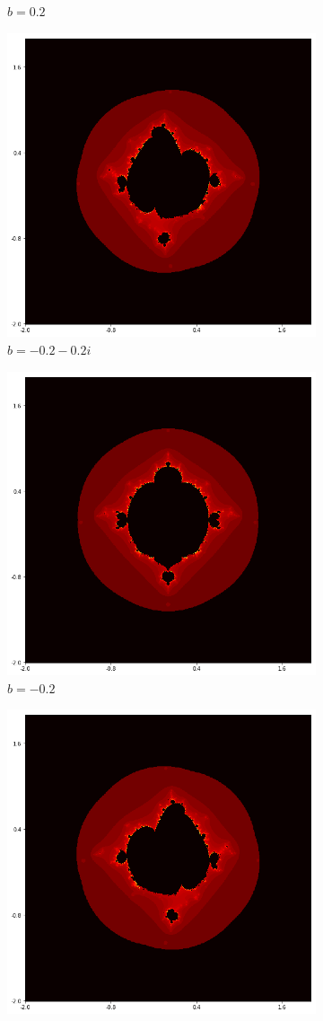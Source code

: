\documentclass{amsart}
\theoremstyle{definition}
\theoremstyle{remark}
\numberwithin{equation}{section}
\begin{document}
\begin{figure}[h]
\begin{subfigure}{.32\textwidth}
  \caption{$b=0.2$}
\end{subfigure}
\begin{subfigure}{.32\textwidth}
  \centering
  \includegraphics[width=.7\linewidth]{ShiftLocus3b7.png}
  \caption{$b=-0.2-0.2i$}
\end{subfigure}
\begin{subfigure}{.32\textwidth}
  \centering
  \includegraphics[width=.7\linewidth]{ShiftLocus3b8.png}
  \caption{$b=-0.2$}
\end{subfigure}
\begin{subfigure}{.32\textwidth}
  \centering
  \includegraphics[width=.7\linewidth]{ShiftLocus3b9.png}

\end{subfigure}
\end{figure}
\end{document}
